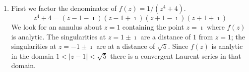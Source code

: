 {\begin{Solution}
\begin{enumerate}
\begin{enumerate}
\begin{align*}
        \\
        &= \sum_{n = -2}^{-\infty} \left( 1 - 2^{- n - 1} \right) (z + 1)^n,
        \quad \mathrm{for}\ |z + 1| > 2
      \end{align*}
    \end{enumerate}
  \item 
    First we factor the denominator of $f(z) = 1 / (z^4 + 4)$.
    \[
    z^4 + 4 = (z - 1 - \imath) (z - 1 + \imath) (z + 1 - \imath) (z + 1 + \imath)
    \]
    We look for an annulus about $z = 1$ containing the point $z = \imath$ 
    where $f(z)$ is analytic.
    The singularities at $z = 1 \pm \imath$ are a distance of $1$ from $z = 1$;
    the singularities at $z = -1 \pm \imath$ are at a distance of $\sqrt{5}$.
    Since $f(z)$ is analytic in the domain $1 < |z - 1| < \sqrt{5}$
    there is a convergent Laurent series in that domain.
  \end{enumerate}
\end{Solution}



\raggedbottom
}
